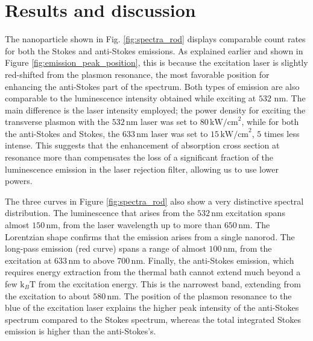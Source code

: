 \documentclass[journal=nalefd,manuscript=letter]{achemso}
\newcommand{\nm}{\ensuremath{\,\textrm{nm}}}
\newcommand{\pwr}{\ensuremath{\,\textrm{kW/cm}^2}}
\begin{document}
\section{Results and discussion}

The nanoparticle shown in Fig. \ref{fig:spectra_rod} displays comparable count
rates for both the Stokes and anti-Stokes emissions. As explained earlier and
shown in Figure \ref{fig:emission_peak_position}, this is because the excitation
laser is slightly red-shifted from the plasmon resonance, the most favorable
position for enhancing the anti-Stokes part of the spectrum. Both types of
emission are also comparable to the luminescence intensity obtained while
exciting at $532\,\nm$. The main difference is the laser intensity employed; the
power density for exciting the transverse plasmon with the $532\nm$ laser was
set to $80\pwr$, while for both the anti-Stokes and Stokes, the $633\nm$ laser
was set to $15\pwr$, $5$ times less intense. This suggests that the enhancement
of absorption cross section at resonance more than compensates the loss of a
significant fraction of the luminescence emission in the laser rejection filter,
allowing us to use lower powers.

The three curves in Figure \ref{fig:spectra_rod} also show a very distinctive
spectral distribution. The luminescence that arises from the $532\nm$ excitation
spans almost $150\nm$, from the laser wavelength up to more than $650\nm$. The
Lorentzian shape confirms that the emission arises from a single nanorod. The
long-pass emission (red curve) spans a range of almost $100\nm$, from the
excitation at $633\nm$ to above $700\nm$. Finally, the anti-Stokes emission,
which requires energy extraction from the thermal bath cannot extend much beyond
a few $\textrm{k}_{B}\textrm{T}$ from the excitation energy. This is the
narrowest band, extending from the excitation to about $580\nm$. The position of
the plasmon resonance to the blue of the excitation laser explains the higher
peak intensity of the anti-Stokes spectrum compared to the Stokes spectrum,
whereas the total integrated Stokes emission is higher than the anti-Stokes's.
\end{document}
